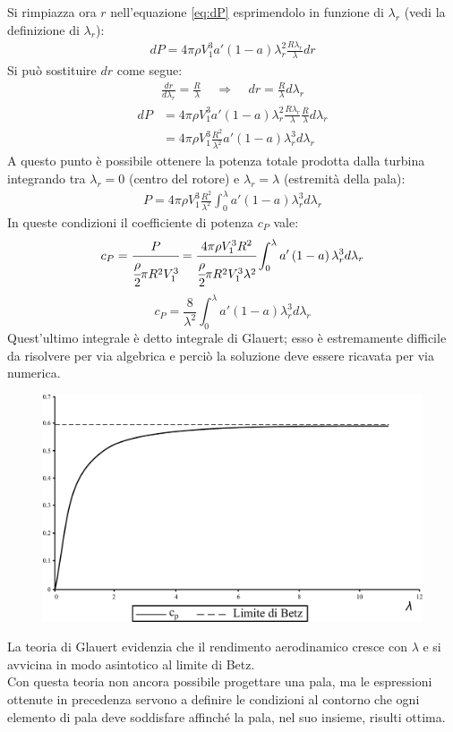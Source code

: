 Si rimpiazza ora $r$ nell'equazione \ref{eq:dP} esprimendolo in funzione di $\lambda_r$ (vedi la definizione di $\lambda_r$):
\begin{align*}
dP = 4 \pi \rho V_1^3 a' \left( 1 - a \right) \lambda_r^2 \frac{R \lambda_r}{\lambda} dr
\end{align*}
Si può sostituire $dr$ come segue:
\begin{align*}
\frac{dr}{d \lambda_r} = \frac{R}{\lambda} \;\;\;\; \Rightarrow \;\;\;\; dr = \frac{R}{\lambda} d \lambda_r
\end{align*}
\begin{align*}
dP &= 4 \pi \rho V_1^3 a' \left(1 - a \right) \lambda_r^2 \frac{R \lambda_r}{\lambda} \frac{R}{\lambda} d \lambda_r\\
&= 4 \pi \rho V_1^3 \frac{R^2}{\lambda^2} a' \left( 1 - a \right) \lambda_r^3 d\lambda_r
\end{align*}
A questo punto è possibile ottenere la potenza totale prodotta dalla turbina integrando tra $\lambda_r = 0$ (centro del rotore) e $\lambda_r = \lambda$ (estremità della pala):
\begin{align*}
P = 4 \pi \rho V_1^3 \frac{R^2}{\lambda^2} \int_0^{\lambda} a' \left( 1 - a \right) \lambda_r^3 d \lambda_r
\end{align*}
In queste condizioni il coefficiente di potenza $c_P$ vale:
\begin{align*}
c_P = \cfrac{P}{\cfrac{\rho}{2} \pi R^2 V_1^3} = \cfrac{4 \pi \rho V_1^3 R^2}{\cfrac{\rho}{2} \pi R^2  V_1^3 \lambda^2} \int_0^{\lambda} a' \left(1 - a \right) \lambda_r^3 d \lambda_r
\end{align*}
\begin{equation}
c_P = \frac{8}{\lambda^2} \int_0^{\lambda} a' \left( 1 - a \right) \lambda_r^3 d \lambda_r
\end{equation}
Quest'ultimo integrale è detto integrale di Glauert; esso è estremamente difficile da risolvere per via algebrica e perciò la soluzione deve essere ricavata per via numerica.
\begin{figure}[h!]
\centering
  \includegraphics[width=.7\textwidth]{fig/limBetz.pdf}
\caption{}
\label{fig:limBetz}
\end{figure}
La teoria di Glauert evidenzia che il rendimento aerodinamico cresce con $\lambda$ e si avvicina in modo asintotico al limite di Betz. \\
Con questa teoria non ancora possibile progettare una pala, ma le espressioni ottenute in precedenza servono a definire le condizioni al contorno che ogni elemento di pala deve soddisfare affinché la pala, nel suo insieme, risulti ottima.

